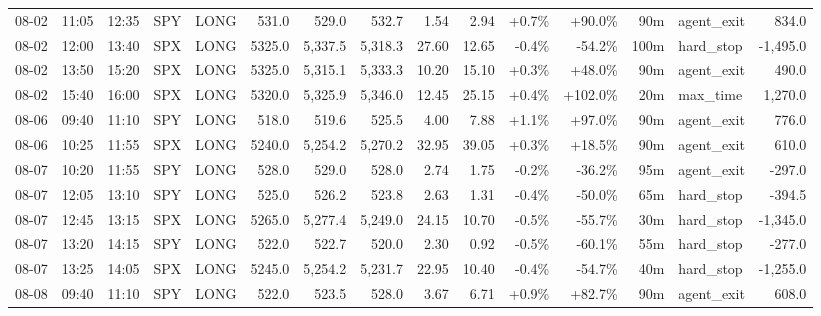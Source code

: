 \documentclass[11pt,a4paper,twoside]{article}
\begin{document}
\begin{landscape}
\begin{center}
\begin{longtable}{>{\color{txtmain}}l l l l l r r r r r r r r >{\color{txtmain}}l r}
08-02 & 11:05 & 12:35 & SPY & LONG & 531.0 & 529.0 & 532.7 & 1.54 & 2.94 & \textcolor{wingreen}{+0.7\%} & \textcolor{wingreen}{+90.0\%} & 90m & agent\_exit & \textcolor{wingreen}{834.0} \\
08-02 & 12:00 & 13:40 & SPX & LONG & 5325.0 & 5,337.5 & 5,318.3 & 27.60 & 12.65 & \textcolor{lossred}{-0.4\%} & \textcolor{lossred}{-54.2\%} & 100m & hard\_stop & \textcolor{lossred}{-1,495.0} \\
08-02 & 13:50 & 15:20 & SPX & LONG & 5325.0 & 5,315.1 & 5,333.3 & 10.20 & 15.10 & \textcolor{wingreen}{+0.3\%} & \textcolor{wingreen}{+48.0\%} & 90m & agent\_exit & \textcolor{wingreen}{490.0} \\
08-02 & 15:40 & 16:00 & SPX & LONG & 5320.0 & 5,325.9 & 5,346.0 & 12.45 & 25.15 & \textcolor{wingreen}{+0.4\%} & \textcolor{wingreen}{+102.0\%} & 20m & max\_time & \textcolor{wingreen}{1,270.0} \\
08-06 & 09:40 & 11:10 & SPY & LONG & 518.0 & 519.6 & 525.5 & 4.00 & 7.88 & \textcolor{wingreen}{+1.1\%} & \textcolor{wingreen}{+97.0\%} & 90m & agent\_exit & \textcolor{wingreen}{776.0} \\
08-06 & 10:25 & 11:55 & SPX & LONG & 5240.0 & 5,254.2 & 5,270.2 & 32.95 & 39.05 & \textcolor{wingreen}{+0.3\%} & \textcolor{wingreen}{+18.5\%} & 90m & agent\_exit & \textcolor{wingreen}{610.0} \\
08-07 & 10:20 & 11:55 & SPY & LONG & 528.0 & 529.0 & 528.0 & 2.74 & 1.75 & \textcolor{lossred}{-0.2\%} & \textcolor{lossred}{-36.2\%} & 95m & agent\_exit & \textcolor{lossred}{-297.0} \\
08-07 & 12:05 & 13:10 & SPY & LONG & 525.0 & 526.2 & 523.8 & 2.63 & 1.31 & \textcolor{lossred}{-0.4\%} & \textcolor{lossred}{-50.0\%} & 65m & hard\_stop & \textcolor{lossred}{-394.5} \\
08-07 & 12:45 & 13:15 & SPX & LONG & 5265.0 & 5,277.4 & 5,249.0 & 24.15 & 10.70 & \textcolor{lossred}{-0.5\%} & \textcolor{lossred}{-55.7\%} & 30m & hard\_stop & \textcolor{lossred}{-1,345.0} \\
08-07 & 13:20 & 14:15 & SPY & LONG & 522.0 & 522.7 & 520.0 & 2.30 & 0.92 & \textcolor{lossred}{-0.5\%} & \textcolor{lossred}{-60.1\%} & 55m & hard\_stop & \textcolor{lossred}{-277.0} \\
08-07 & 13:25 & 14:05 & SPX & LONG & 5245.0 & 5,254.2 & 5,231.7 & 22.95 & 10.40 & \textcolor{lossred}{-0.4\%} & \textcolor{lossred}{-54.7\%} & 40m & hard\_stop & \textcolor{lossred}{-1,255.0} \\
08-08 & 09:40 & 11:10 & SPY & LONG & 522.0 & 523.5 & 528.0 & 3.67 & 6.71 & \textcolor{wingreen}{+0.9\%} & \textcolor{wingreen}{+82.7\%} & 90m & agent\_exit & \textcolor{wingreen}{608.0} \\

\end{longtable}
\end{center}
\end{landscape}
\end{document}
